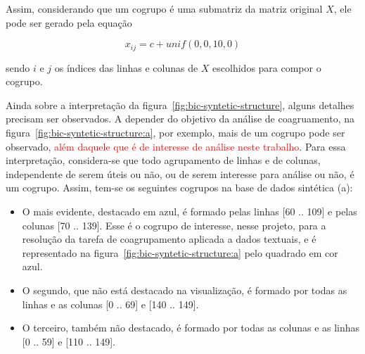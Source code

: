 \documentclass[
    12pt,                %
    oneside,            %
    a4paper,            %
    english,            %
    brazil                %
    ]{abntex2ppgsi}
\begin{document}

Assim, considerando que um cogrupo é uma submatriz da matriz original $X$, ele pode ser gerado pela equação %

\begin{equation}
\label{eq:genbic}
    x_{ij} = c + unif(0,0, 10,0)    \nonumber
\end{equation}

sendo $i$ e $j$ os índices das linhas e colunas de $X$ escolhidos para compor o cogrupo.


Ainda sobre a interpretação da figura~\ref{fig:bic-syntetic-structure}, alguns detalhes precisam ser observados. A depender do objetivo da análise de coagruamento, na figura~\ref{fig:bic-syntetic-structure:a}, por exemplo, mais de um cogrupo pode ser observado, \textcolor{red}{além daquele que é de interesse de análise neste trabalho}. Para essa interpretação, considera-se que todo agrupamento de linhas e de colunas, independente de serem úteis ou não, ou de serem interesse para análise ou não, é um cogrupo. Assim, tem-se os seguintes cogrupos na base de dados sintética (a):


\begin{itemize}
\item O mais evidente, destacado em azul, é formado pelas linhas [60 .. 109] e pelas colunas [70 .. 139]. Esse é o cogrupo de interesse, nesse projeto, para a resolução da tarefa de coagrupamento aplicada a dados textuais, e é representado na figura~\ref{fig:bic-syntetic-structure:a} pelo quadrado em cor azul.
\item O segundo, que não está destacado na visualização, é formado por todas as linhas e as colunas [0 .. 69] e [140 .. 149].
\item O terceiro, também não destacado, é formado por todas as colunas e as linhas [0 .. 59] e [110 .. 149].
\end{itemize}
\end{document}

